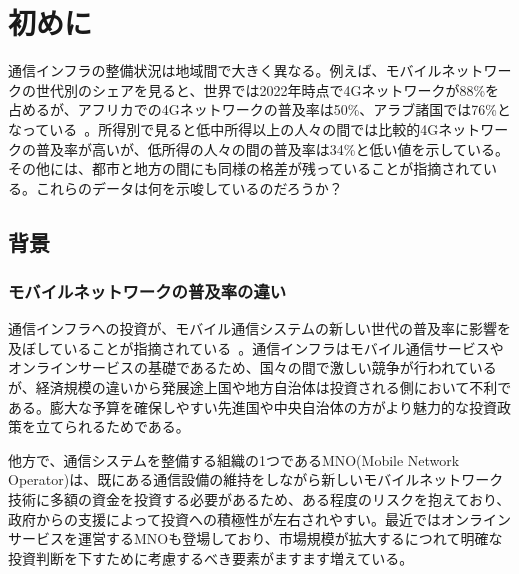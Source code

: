 \section{初めに}
\label{section:初めに}
通信インフラの整備状況は地域間で大きく異なる。例えば、モバイルネットワークの世代別のシェアを見ると、世界では2022年時点で4Gネットワークが88\%を占めるが、アフリカでの4Gネットワークの普及率は50\%、アラブ諸国では76\%となっている~\cite{ITU2022FactsAndFigures}。所得別で見ると低中所得以上の人々の間では比較的4Gネットワークの普及率が高いが、低所得の人々の間の普及率は34\%と低い値を示している。その他には、都市と地方の間にも同様の格差が残っていることが指摘されている。これらのデータは何を示唆しているのだろうか？
\subsection{背景}
\label{subsection:背景}
\subsubsection{モバイルネットワークの普及率の違い}
\label{subsubsection:モバイルネットワークの普及率の違い}
通信インフラへの投資が、モバイル通信システムの新しい世代の普及率に影響を及ぼしていることが指摘されている~\cite{Forge2020FormingA5GStrategyForDevelopingCountries}。通信インフラはモバイル通信サービスやオンラインサービスの基礎であるため、国々の間で激しい競争が行われているが、経済規模の違いから発展途上国や地方自治体は投資される側において不利である。膨大な予算を確保しやすい先進国や中央自治体の方がより魅力的な投資政策を立てられるためである。

他方で、通信システムを整備する組織の1つであるMNO(Mobile Network Operator)は、既にある通信設備の維持をしながら新しいモバイルネットワーク技術に多額の資金を投資する必要があるため、ある程度のリスクを抱えており、政府からの支援によって投資への積極性が左右されやすい。最近ではオンラインサービスを運営するMNOも登場しており、市場規模が拡大するにつれて明確な投資判断を下すために考慮するべき要素がますます増えている。

